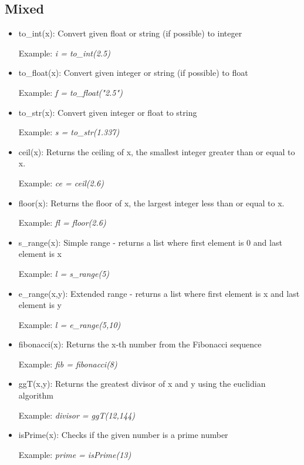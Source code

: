 \documentclass{article}
\begin{document}
\subsection{Mixed}
\begin{itemize}
\item to\_int(x): Convert given float or string (if possible) to integer

Example: \textit{i = to\_int(2.5)}

\item to\_float(x): Convert given integer or string (if possible) to float

Example: \textit{f = to\_float("2.5")}

\item to\_str(x): Convert given integer or float to string

Example: \textit{s = to\_str(1.337)}

\item ceil(x): Returns the ceiling of x, the smallest integer greater than or equal to x.

Example: \textit{ce = ceil(2.6)}

\item floor(x): Returns the floor of x, the largest integer less than or equal to x.

Example: \textit{fl = floor(2.6)}

\item s\_range(x): Simple range - returns a list where first element is 0 and last element is x

Example: \textit{l = s\_range(5)}

\item e\_range(x,y): Extended range - returns a list where first element is x and last element is y

Example: \textit{l = e\_range(5,10)}

\item fibonacci(x): Returns the x-th number from the Fibonacci sequence

Example: \textit{fib = fibonacci(8)}

\item ggT(x,y): Returns the greatest divisor of x and y using the euclidian algorithm

Example: \textit{divisor = ggT(12,144)}

\item isPrime(x): Checks if the given number is a prime number

Example: \textit{prime = isPrime(13)}


\end{itemize}
\end{document}
